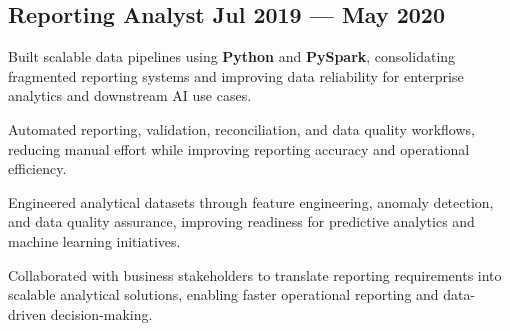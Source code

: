 
\subsection{{Reporting Analyst \hfill Jul 2019 --- May 2020}}
\begin{zitemize}

\item Built scalable data pipelines using \textbf{Python} and \textbf{PySpark}, consolidating fragmented reporting systems and improving data reliability for enterprise analytics and downstream AI use cases.

\item Automated reporting, validation, reconciliation, and data quality workflows, reducing manual effort while improving reporting accuracy and operational efficiency.

\item Engineered analytical datasets through feature engineering, anomaly detection, and data quality assurance, improving readiness for predictive analytics and machine learning initiatives.

\item Collaborated with business stakeholders to translate reporting requirements into scalable analytical solutions, enabling faster operational reporting and data-driven decision-making.

\end{zitemize}